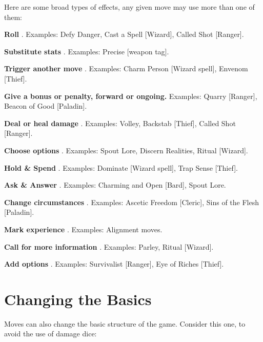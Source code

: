  

Here are some broad types of effects, any given move may use more than one of them:

 
\startitemize[1,packed]

\item {\bf Roll} . Examples: Defy Danger, Cast a Spell [Wizard], Called Shot [Ranger].

 
\item {\bf Substitute stats} . Examples: Precise [weapon tag].

 
\item {\bf Trigger another move} . Examples: Charm Person [Wizard spell], Envenom [Thief].

 
\item {\bf Give a bonus or penalty, forward or ongoing.}  Examples: Quarry [Ranger], Beacon of Good [Paladin].

 
\item {\bf Deal or heal damage} . Examples: Volley, Backstab [Thief], Called Shot [Ranger].

 
\item {\bf Choose options} . Examples: Spout Lore, Discern Realities, Ritual [Wizard].

 
\item {\bf Hold \& Spend} . Examples: Dominate [Wizard spell], Trap Sense [Thief].

 
\item {\bf Ask \& Answer} . Examples: Charming and Open [Bard], Spout Lore.

 
\item {\bf Change circumstances} . Examples: Ascetic Freedom [Cleric], Sins of the Flesh [Paladin].

 
\item {\bf Mark experience} . Examples: Alignment moves.

 
\item {\bf Call for more information} . Examples: Parley, Ritual [Wizard].

 
\item {\bf Add options} . Examples: Survivalist [Ranger], Eye of Riches [Thief].


\stopitemize
 
\section{Changing the Basics}   
 

Moves can also change the basic structure of the game. Consider this one, to avoid the use of damage dice:


